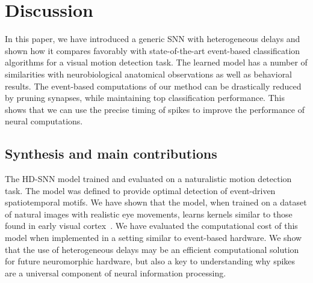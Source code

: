 \documentclass[default]{sn-jnl}%
\theoremstyle{thmstyleone}%
\theoremstyle{thmstyletwo}%
\theoremstyle{thmstylethree}%
\begin{document}
\section{Discussion}
In this paper, we have introduced a generic SNN with heterogeneous delays and shown how it compares favorably with state-of-the-art event-based classification algorithms for a visual motion detection task. The learned model has a number of similarities with neurobiological anatomical observations as well as behavioral results. The event-based computations of our method can be drastically reduced by pruning synapses, while maintaining top classification performance. This shows that we can use the precise timing of spikes to improve the performance of neural computations.
%
\subsection{Synthesis and main contributions}
The HD-SNN model trained and evaluated on a naturalistic motion detection task. The model was defined to provide optimal detection of event-driven spatiotemporal motifs. We have shown that the model, when trained on a dataset of natural images with realistic eye movements, learns kernels similar to those found in early visual cortex~\cite{deangelis_functional_1999, kremkow_push-pull_2016}. We have evaluated the computational cost of this model when implemented in a setting similar to event-based hardware. We show that the use of heterogeneous delays may be an efficient computational solution for future neuromorphic hardware, but also a key to understanding why spikes are a universal component of neural information processing.
\end{document}
